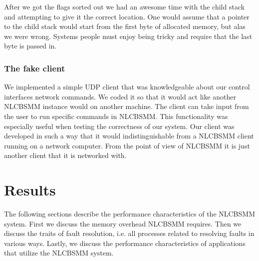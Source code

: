 \documentclass[9pt]{sig-alternate-10pt}
\begin{document}
After we got the flags sorted out we had an awesome time with the child stack and attempting to give it the correct location. One would assume that a pointer to the child stack would start from the first byte of allocated memory, but alas we were wrong. Systems people must enjoy being tricky and require that the last byte is passed in.

\subsubsection{The fake client}
We implemented a simple UDP client that was knowledgeable about our control interfaces network commands. We coded it so that it would act like another NLCBSMM instance would on another machine. The client can take input from the user to run specific commands in NLCBSMM. This functionality was especially useful when testing the correctness of our system. Our client was developed in such a way that it would indistinguishable from a NLCBSMM client running on a network computer. From the point of view of NLCBSMM it is just another client that it is networked with.

\section{Results}
\label{results}
The following sections describe the performance characteristics of the NLCBSMM system.  First we discuss the memory overhead NLCBSMM requires. Then we discuss the traits of fault resolution, i.e. all processes related to resolving faults in various ways.  Lastly, we discuss the performance characteristics of applications that utilize the NLCBSMM system.


\end{document}
